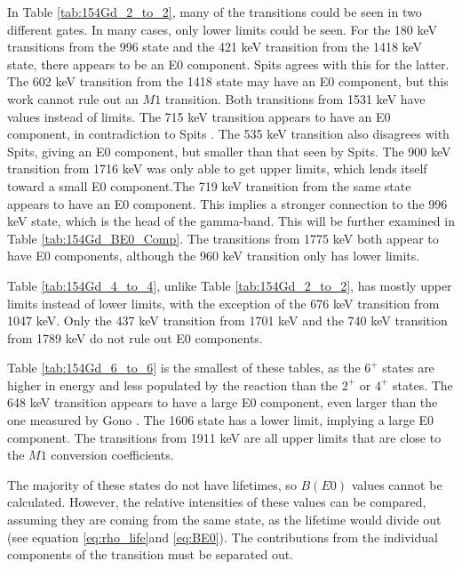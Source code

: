 \afterpage{\clearpage}

In Table \ref{tab:154Gd_2_to_2}, many of the transitions could be seen in two different gates. In many cases, only lower limits could be seen. For the 180 keV transitions from the 996 state and the 421 keV transition from the 1418 keV state, there appears to be an E0 component. Spits \cite{spits96:_154gd} agrees with this for the latter. The 602 keV transition from the 1418 state may have an E0 component, but this work cannot rule out an $M1$ transition. Both transitions from 1531 keV have values instead of limits. The 715 keV transition appears to have an E0 component, in contradiction to Spits \cite{spits96:_154gd}. The 535 keV transition also disagrees with Spits, giving an E0 component, but smaller than that seen by Spits. The 900 keV transition from 1716 keV was only able to get upper limits, which lends itself toward a small E0 component.The 719 keV transition from the same state appears to have an E0 component. This implies a stronger connection to the 996 keV state, which is the head of the gamma-band. This will be further examined in Table \ref{tab:154Gd_BE0_Comp}. The transitions from 1775 keV both appear to have E0 components, although the 960 keV transition only has lower limits.

\afterpage{\clearpage}

Table \ref{tab:154Gd_4_to_4}, unlike Table \ref{tab:154Gd_2_to_2}, has mostly upper limits instead of lower limits, with the exception of the 676 keV transition from 1047 keV. Only the 437 keV transition from 1701 keV and the 740 keV transition from 1789 keV do not rule out E0 components.

\afterpage{\clearpage}

Table \ref{tab:154Gd_6_to_6} is the smallest of these tables, as the $6^+$ states are higher in energy and less populated by the reaction than the $2^+$ or $4^+$ states. The 648 keV transition appears to have a large E0 component, even larger than the one measured by Gono \cite{gono74:_154gd_e0}. The 1606 state has a lower limit, implying a large E0 component. The transitions from 1911 keV are all upper limits that are close to the $M1$ conversion coefficients.   

The majority of these states do not have lifetimes, so $B(E0)$ values cannot be calculated. However, the relative intensities of these values can be compared, assuming they are coming from the same state, as the lifetime would divide out (see equation \ref{eq:rho_life}and \ref{eq:BE0}). The contributions from the individual components of the transition must be separated out.

